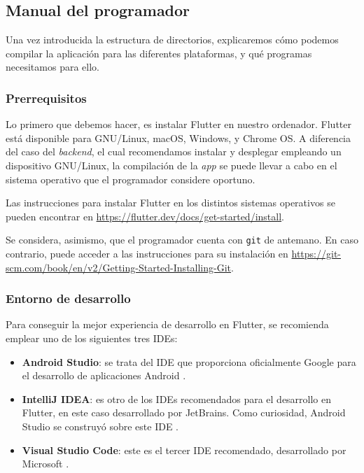 \subsection{Manual del programador}

Una vez introducida la estructura de directorios, explicaremos cómo podemos compilar la aplicación para las diferentes plataformas, y qué programas necesitamos para ello.

\subsubsection{Prerrequisitos}

Lo primero que debemos hacer, es instalar Flutter en nuestro ordenador. Flutter está disponible para GNU/Linux, macOS, Windows, y Chrome OS. A diferencia del caso del \emph{backend}, el cual recomendamos instalar y desplegar empleando un dispositivo GNU/Linux, la compilación de la \emph{app} se puede llevar a cabo en el sistema operativo que el programador considere oportuno.

Las instrucciones para instalar Flutter en los distintos sistemas operativos se pueden encontrar en \href{https://flutter.dev/docs/get-started/install}{https://flutter.dev/docs/get-started/install}.

Se considera, asimismo, que el programador cuenta con \texttt{git} de antemano. En caso contrario, puede acceder a las instrucciones para su instalación en \href{https://git-scm.com/book/en/v2/Getting-Started-Installing-Git}{https://git-scm.com/book/en/v2/Getting-Started-Installing-Git}.

\subsubsection{Entorno de desarrollo}

Para conseguir la mejor experiencia de desarrollo en Flutter, se recomienda emplear uno de los siguientes tres IDEs:

\vspace{-0.2cm}
\begin{itemize} [\textbullet]
	\item \textbf{Android Studio}: se trata del IDE que proporciona oficialmente Google para el desarrollo de aplicaciones Android \cite{android-studio}.
	
	\item \textbf{IntelliJ IDEA}: es otro de los IDEs recomendados para el desarrollo en Flutter, en este caso desarrollado por JetBrains. Como curiosidad, Android Studio se construyó sobre este IDE \cite{intellij}.
	
	\item \textbf{Visual Studio Code}: este es el tercer IDE recomendado, desarrollado por Microsoft \cite{visual-code}.
\end{itemize}

